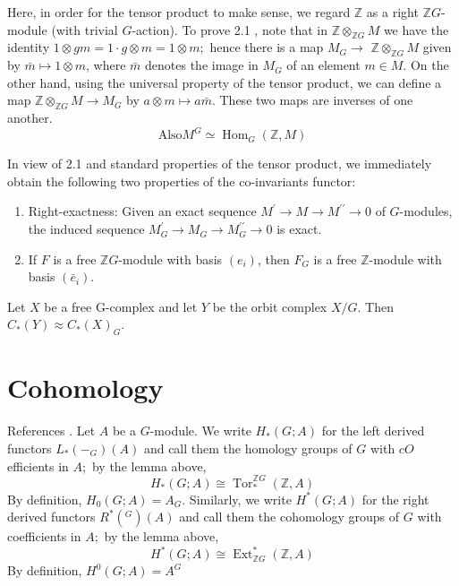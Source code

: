 Here, in order for the tensor product to make sense, we regard $\mathbb{Z}$ as a right $\mathbb{Z} G$-module (with trivial $G$-action). To prove 2.1 , note that in $\mathbb{Z} \otimes_{\mathbb{Z} G} M$ we have the identity $1 \otimes g m=1 \cdot g \otimes m=1 \otimes m ;$ hence there is a map $M_G \rightarrow$ $\mathbb{Z} \otimes_{\mathbb{Z} G} M$ given by $\bar{m} \mapsto 1 \otimes m$, where $\bar{m}$ denotes the image in $M_G$ of an element $m \in M$. On the other hand, using the universal property of the tensor product, we can define a map $\mathbb{Z} \otimes_{\mathbb{Z} G} M \rightarrow M_G$ by $a \otimes m \mapsto a \bar{m}$. These two maps are inverses of one another. $$\text{Also} M^G \simeq \operatorname{Hom}_G(\mathbb{Z},M) $$

In view of 2.1 and standard properties of the tensor product, we immediately obtain the following two properties of the co-invariants functor:

\begin{enumerate}
    \item Right-exactness: Given an exact sequence $M^{\prime} \rightarrow M \rightarrow M^{\prime \prime} \rightarrow 0$ of $G$-modules, the induced sequence $M_G^{\prime} \rightarrow M_G \rightarrow M_G^{\prime \prime} \rightarrow 0$ is exact.
    \item If $F$ is a free $\mathbb{Z} G$-module with basis $\left(e_i\right)$, then $F_G$ is a free $\mathbb{Z}$-module with basis $\left(\bar{e}_i\right)$.
\end{enumerate}

\begin{prop}
    
    Let $X$ be a free G-complex and let $Y$ be the orbit complex $X / G$. Then $C_*(Y) \approx C_*(X)_G$.
\end{prop}






\section{Cohomology}
References \cite{weibelIntroductionHomologicalAlgebra1994}.
Let $A$ be a $G$-module. We write $H_*(G ; A)$ for the left derived functors $L_*\left(-_G\right)(A)$ and call them the homology groups of $G$ with $c O$ efficients in $A ;$ by the lemma above, $$H_*(G ; A) \cong \operatorname{Tor}_*^{\mathbb{Z} G}(\mathbb{Z}, A)$$ By definition, $H_0(G ; A)=A_G$. Similarly, we write $H^*(G ; A)$ for the right derived functors $R^*\left({ }^G\right)(A)$ and call them the cohomology groups of $G$ with coefficients in $A ;$ by the lemma above, $$H^*(G ; A) \cong \operatorname{Ext}_{\mathbb{Z} G}^*(\mathbb{Z}, A)$$ By definition, $H^0(G ; A)=A^G$

